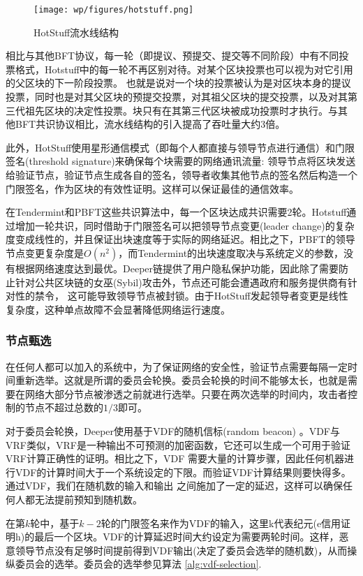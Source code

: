 \documentclass[a4paper]{article}
\begin{document}
\begin{figure}[hhhh]
\centering
\texttt{[image: wp/figures/hotstuff.png]}
\caption{HotStuff流水线结构}
\label{fig:hotstuff}
\end{figure}

相比与其他BFT协议，每一轮（即提议、预提交、提交等不同阶段）中有不同投票格式，Hotstuff中的每一轮不再区别对待。对某个区块投票也可以视为对它引用的父区块的下一阶段投票。 也就是说对一个块的投票被认为是对区块本身的提议投票，同时也是对其父区块的预提交投票，对其祖父区块的提交投票，以及对其第三代祖先区块的决定性投票。块只有在其第三代区块被成功投票时才执行。与其 他BFT共识协议相比，流水线结构的引入提高了吞吐量大约3倍。

此外，HotStuff使用星形通信模式（即每个人都直接与领导节点进行通信）和门限签名(threshold signature)来确保每个块需要的网络通讯流量: 领导节点将区块发送给验证节点，验证节点生成各自的签名，领导者收集其他节点的签名然后构造一个门限签名，作为区块的有效性证明。这样可以保证最佳的通信效率。

在Tendermint和PBFT这些共识算法中，每一个区块达成共识需要2轮。Hotstuff通过增加一轮共识，同时借助于门限签名可以把领导节点变更(leader change)的复杂度变成线性的，并且保证出块速度等于实际的网络延迟。相比之下，PBFT的领导节点变更复杂度是$O(n^2)$，而Tendermint的出块速度取决与系统定义的参数，没有根据网络速度达到最优。Deeper链提供了用户隐私保护功能，因此除了需要防止针对公共区块链的女巫(Sybil)攻击外，节点还可能会遭遇政府和服务提供商有针对性的禁令， 这可能导致领导节点被封锁。由于HotStuff发起领导者变更是线性复杂度，这种单点故障不会显著降低网络运行速度。

\subsubsection{节点甄选}
在任何人都可以加入的系统中，为了保证网络的安全性，验证节点需要每隔一定时间重新选举。这就是所谓的委员会轮换。委员会轮换的时间不能够太长，也就是需要在网络大部分节点被渗透之前就进行选举。只要在两次选举的时间内，攻击者控制的节点不超过总数的$1/3$即可。

对于委员会轮换，Deeper使用基于VDF的随机信标(random beacon) \cite{boneh2018verifiable}。VDF与VRF类似，VRF是一种输出不可预测的加密函数，它还可以生成一个可用于验证VRF计算正确性的证明。相比之下，VDF 需要大量的计算步骤，因此任何机器进行VDF的计算时间大于一个系统设定的下限。而验证VDF计算结果则要快得多。通过VDF，我们在随机数的输入和输出
之间施加了一定的延迟，这样可以确保任何人都无法提前预知到随机数。

在第$k$轮中，基于$k-2$轮的门限签名来作为VDF的输入，这里k代表纪元(e信用证明h)的最后一个区块。VDF的计算延迟时间大约设定为需要两轮时间。这样，恶意领导节点没有足够时间提前得到VDF输出(决定了委员会选举的随机数)，从而操纵委员会的选举。委员会的选举参见算法 \ref{alg:vdf-selection}.
\end{document}
